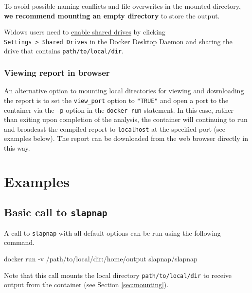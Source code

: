 \documentclass[]{article}
\newenvironment{Shaded}{\begin{snugshade}}{\end{snugshade}}
\newcommand{\ExtensionTok}[1]{#1}
\newcommand{\NormalTok}[1]{#1}
\begin{document}
To avoid possible naming conflicts and file overwrites in the mounted
directory, \textbf{we recommend mounting an empty directory} to store
the output.

Widows users need to
\href{https://docs.docker.com/docker-for-windows/troubleshoot/\#volume-mounting-requires-shared-drives-for-linux-containers}{enable
shared drives} by clicking
\texttt{Settings\ \textgreater{}\ Shared\ Drives} in the Docker Desktop
Daemon and sharing the drive that contains \texttt{path/to/local/dir}.

\subsubsection{Viewing report in browser}\label{sec:viewreport}

An alternative option to mounting local directories for viewing and
downloading the report is to set the \texttt{view\_port} option to
\texttt{"TRUE"} and open a port to the container via the \texttt{-p}
option in the \texttt{docker\ run} statement. In this case, rather than
exiting upon completion of the analysis, the container will continuing
to run and broadcast the compiled report to \texttt{localhost} at the
specified port (see examples below). The report can be downloaded from
the web browser directly in this way.

\section{Examples}\label{sec:examples}

\subsection{\texorpdfstring{Basic call to
\texttt{slapnap}}{Basic call to slapnap}}\label{basic-call-to-slapnap}

A call to \texttt{slapnap} with all default options can be run using the
following command.

\begin{Shaded}
\begin{Highlighting}[]
\ExtensionTok{docker}\NormalTok{ run -v /path/to/local/dir:/home/output slapnap/slapnap}
\end{Highlighting}
\end{Shaded}

Note that this call mounts the local directory
\texttt{path/to/local/dir} to receive output from the container (see
Section \ref{sec:mounting}).
\end{document}
